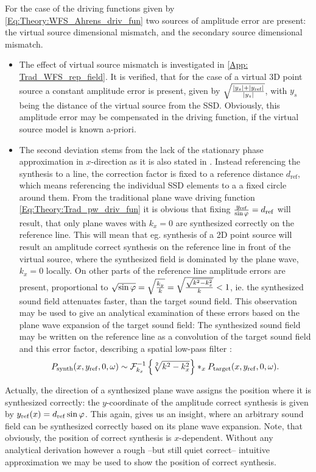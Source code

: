 \vspace{3mm}
For the case of the driving functions given by \eqref{Eq:Theory:WFS_Ahrens_driv_fun} two sources of amplitude error are present: the virtual source dimensional mismatch, and the secondary source dimensional mismatch.
\begin{itemize}
\item
The effect of virtual source mismatch is investigated in \ref{App: Trad_WFS_rep_field}. It is verified, that for the case of a virtual 3D point source a constant amplitude error is present, given by $
\sqrt{\frac{|y_s| + |y_{\mathrm{ref}}|}{|y_s|}}$, with $y_s$ being the distance of the virtual source from the SSD. Obviously, this amplitude error may be compensated in the driving function, if the virtual source model is known a-priori.
\item 
The second deviation stems from the lack of the stationary phase approximation in $x$-direction as it is also stated in \cite[3.9.4]{Ahrens2012}. Instead referencing the synthesis to a line, the correction factor is fixed to a reference distance $d_{\mathrm{ref}}$, which means referencing the individual SSD elements to a a fixed circle around them. From the traditional plane wave driving function \eqref{Eq:Theory:Trad_pw_driv_fun} it is obvious that fixing $\frac{y_{\mathrm{ref}}}{\sin\varphi} = d_{\mathrm{ref}}$ will result, that only plane waves with $k_x = 0$ are synthesized correctly on the reference line. This will mean that eg. synthesis of a 2D point source will result an amplitude correct synthesis on the reference line in front of the virtual source, where the synthesized field is dominated by the plane wave, $k_x = 0$ locally. On other parts of the reference line amplitude errors are present, proportional to $\sqrt{\sin\varphi }= \sqrt{\frac{k_y}{k}} = \sqrt{\frac{\sqrt{k^2-k_x^2}}{k}}<1$, ie. the synthesized sound field attenuates faster, than the target sound field. This observation may be used to give an analytical examination of these errors based on the plane wave expansion of the target sound field: The synthesized sound field may be written on the reference line as a convolution of the target sound field and this error factor, describing a spatial low-pass filter :
\begin{equation}
P_{\mathrm{synth}}(x,y_{\mathrm{ref}},0,\omega) \sim \mathcal{F}^{-1}_{k_x} \left\{ \sqrt[2]{k^2-k_x^2} \right\} \ast_x P_{\mathrm{target}}(x,y_{\mathrm{ref}},0,\omega).
\end{equation}
\end{itemize}

Actually, the direction of a synthesized plane wave assigns the position where it is synthesized correctly: the $y$-coordinate of the amplitude correct synthesis is given by $y_{\mathrm{ref}}(x)= d_{\mathrm{ref}}\sin\varphi$. This again, gives us an insight, where an arbitrary sound field can be synthesized correctly based on its plane wave expansion. Note, that obviously, the position of correct synthesis is $x$-dependent.
Without any analytical derivation however a rough --but still quiet correct-- intuitive approximation we may be used to show the position of correct synthesis.

